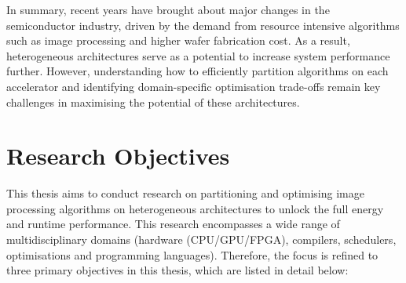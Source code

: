 
In summary, recent years have brought about major changes in the semiconductor industry, driven by the demand from resource intensive algorithms such as image processing and higher wafer fabrication cost. As a result, heterogeneous architectures serve as a potential to increase system performance further. However, understanding how to efficiently partition algorithms on each accelerator and identifying domain-specific optimisation trade-offs remain key challenges in maximising the potential of these architectures.

\newpage

\section{Research Objectives}
This thesis aims to conduct research on partitioning and optimising image processing algorithms on heterogeneous architectures to unlock the full energy and runtime performance. This research encompasses a wide range of multidisciplinary domains (\eg hardware (CPU/GPU/FPGA), compilers, schedulers, optimisations and programming languages). Therefore, the focus is refined to three primary objectives in this thesis, which are listed in detail below:  

